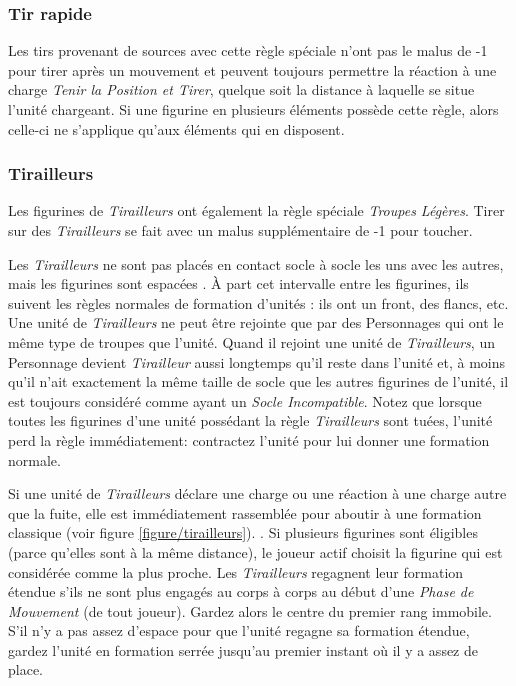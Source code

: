 \subsubsection*{Tir rapide}

Les tirs provenant de sources avec cette règle spéciale n'ont pas le malus de -1 pour tirer après un mouvement et peuvent toujours permettre la réaction à une charge \emph{Tenir la Position et Tirer}, quelque soit la distance à laquelle se situe l'unité chargeant. Si une figurine en plusieurs éléments possède cette règle, alors celle-ci ne s'applique qu'aux éléments qui en disposent.

\subsubsection*{Tirailleurs}

Les figurines de \emph{Tirailleurs} ont également la règle spéciale \emph{Troupes Légères}. Tirer sur des \emph{Tirailleurs} se fait avec un malus supplémentaire de -1 pour toucher.

Les \emph{Tirailleurs} ne sont pas placés en contact socle à socle les uns avec les autres, mais les figurines sont espacées . À part cet intervalle entre les figurines, ils suivent les règles normales de formation d'unités : ils ont un front, des flancs, etc. Une unité de \emph{Tirailleurs} ne peut être rejointe que par des Personnages qui ont le même type de troupes que l'unité. Quand il rejoint une unité de \emph{Tirailleurs}, un Personnage devient \emph{Tirailleur} aussi longtemps qu'il reste dans l'unité et, à moins qu'il n'ait exactement la même taille de socle que les autres figurines de l'unité, il est toujours considéré comme ayant un \emph{Socle Incompatible}. Notez que lorsque toutes les figurines d'une unité possédant la règle \emph{Tirailleurs} sont tuées, l'unité perd la règle immédiatement: contractez l'unité pour lui donner une formation normale.

Si une unité de \emph{Tirailleurs} déclare une charge ou une réaction à une charge autre que la fuite, elle est immédiatement rassemblée pour aboutir à une formation classique (voir figure \ref{figure/tirailleurs}). . Si plusieurs figurines sont éligibles (parce qu'elles sont à la même distance), le joueur actif choisit la figurine qui est considérée comme la plus proche. Les \emph{Tirailleurs} regagnent leur formation étendue s'ils ne sont plus engagés au corps à corps au début d'une \emph{Phase de Mouvement} (de tout joueur). Gardez alors le centre du premier rang immobile. S'il n'y a pas assez d'espace pour que l'unité regagne sa formation étendue, gardez l'unité en formation serrée jusqu'au premier instant où il y a assez de place.

